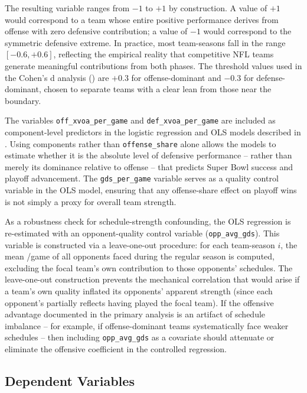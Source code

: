 The resulting variable ranges from $-1$ to $+1$ by construction. A value of
$+1$ would correspond to a team whose entire positive performance derives from
offense with zero defensive contribution; a value of $-1$ would correspond to
the symmetric defensive extreme. In practice, most team-seasons fall in the
range $[-0.6, +0.6]$, reflecting the empirical reality that competitive NFL
teams generate meaningful contributions from both phases. The threshold values
used in the Cohen's d analysis () are $+0.3$ for
offense-dominant and $-0.3$ for defense-dominant, chosen to separate teams
with a clear lean from those near the boundary.

The variables \texttt{off\_xvoa\_per\_game} and \texttt{def\_xvoa\_per\_game}
are included as component-level predictors in the logistic regression and OLS
models described in . Using components rather than
\texttt{offense\_share} alone allows the models to estimate whether it is the
absolute level of defensive performance -- rather than merely its dominance
relative to offense -- that predicts Super Bowl success and playoff advancement.
The \texttt{gds\_per\_game} variable serves as a quality control variable in
the OLS model, ensuring that any offense-share effect on playoff wins is not
simply a proxy for overall team strength.

As a robustness check for schedule-strength confounding, the OLS regression
is re-estimated with an opponent-quality control variable
(\texttt{opp\_avg\_gds}). This variable is constructed via a leave-one-out
procedure: for each team-season $i$, the mean \gds{}/game of all opponents
faced during the regular season is computed, excluding the focal team's own
contribution to those opponents' schedules. The leave-one-out construction
prevents the mechanical correlation that would arise if a team's own quality
inflated its opponents' apparent strength (since each opponent's \gds{}
partially reflects having played the focal team). If the offensive advantage
documented in the primary analysis is an artifact of schedule imbalance -- for
example, if offense-dominant teams systematically face weaker schedules -- then
including \texttt{opp\_avg\_gds} as a covariate should attenuate or eliminate
the offensive \xvoa{} coefficient in the controlled regression.

\subsection{Dependent Variables}
\label{sec:dvs}

